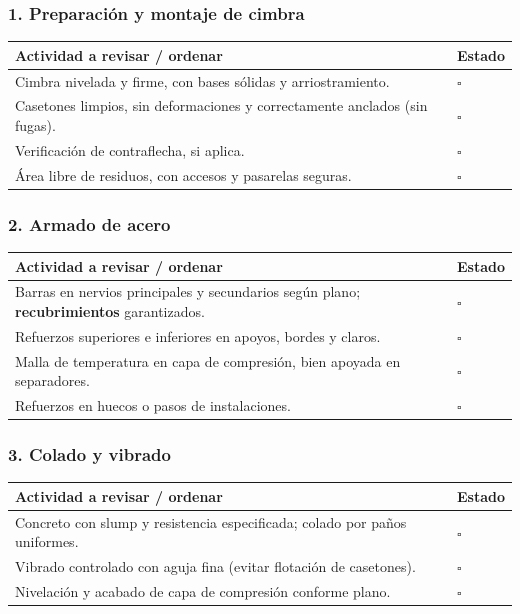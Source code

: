 \documentclass[12pt]{article}
\newcommand{\cbox}{\(\square\)} %
\begin{document}
 \subsubsection*{1. Preparación y montaje de cimbra}
 \begin{tabularx}{\linewidth}{>{\raggedright\arraybackslash}p{0.93\linewidth} >{\centering\arraybackslash}m{0.07\linewidth}}
 	\toprule
 	\textbf{Actividad a revisar / ordenar} & \textbf{Estado}\\
 	\midrule
 	Cimbra nivelada y firme, con bases sólidas y arriostramiento. & \cbox \\
 	Casetones limpios, sin deformaciones y correctamente anclados (sin fugas). & \cbox \\
 	Verificación de contraflecha, si aplica. & \cbox \\
 	Área libre de residuos, con accesos y pasarelas seguras. & \cbox \\
 	\bottomrule
 \end{tabularx}
 
 \subsubsection*{2. Armado de acero}
 \begin{tabularx}{\linewidth}{>{\raggedright\arraybackslash}p{0.93\linewidth} >{\centering\arraybackslash}m{0.07\linewidth}}
 	\toprule
 	\textbf{Actividad a revisar / ordenar} & \textbf{Estado}\\
 	\midrule
 	Barras en nervios principales y secundarios según plano; \textbf{recubrimientos} garantizados. & \cbox \\
 	Refuerzos superiores e inferiores en apoyos, bordes y claros. & \cbox \\
 	Malla de temperatura en capa de compresión, bien apoyada en separadores. & \cbox \\
 	Refuerzos en huecos o pasos de instalaciones. & \cbox \\
 	\bottomrule
 \end{tabularx}
 
 \subsubsection*{3. Colado y vibrado}
 \begin{tabularx}{\linewidth}{>{\raggedright\arraybackslash}p{0.93\linewidth} >{\centering\arraybackslash}m{0.07\linewidth}}
 	\toprule
 	\textbf{Actividad a revisar / ordenar} & \textbf{Estado}\\
 	\midrule
 	Concreto con slump y resistencia especificada; colado por paños uniformes. & \cbox \\
 	Vibrado controlado con aguja fina (evitar flotación de casetones). & \cbox \\
 	Nivelación y acabado de capa de compresión conforme plano. & \cbox \\
 	\bottomrule
 \end{tabularx}
 
\end{document}
